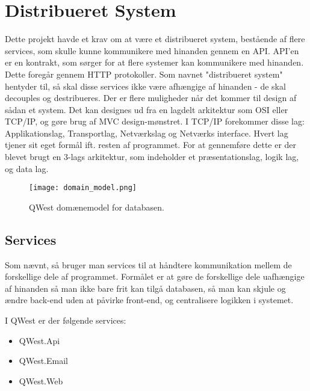 \section{Distribueret System}\label{sec:distSys}
Dette projekt havde et krav om at være et distribueret system, bestående af flere services, som skulle kunne kommunikere med hinanden gennem en API. API'en er en kontrakt, som sørger for at flere systemer kan kommunikere med hinanden\cite{API}. Dette foregår gennem HTTP protokoller\cite{http}. 
Som navnet "distribueret system" hentyder til, så skal disse services ikke være afhængige af hinanden - de skal decouples\cite{decoupling} og destribueres. Der er flere muligheder når det kommer til design af sådan et system. Det kan designes ud fra en lagdelt arkitektur som OSI eller TCP/IP\cite{osi_tcp}, og gøre brug af MVC design-mønstret. I TCP/IP forekommer disse lag: Applikationslag, Transportlag, Netværkslag og Netværks interface. 
Hvert lag tjener sit eget formål ift. resten af programmet. 
For at gennemføre dette er der blevet brugt en 3-lags arkitektur, som indeholder et præsentationslag, logik lag, og data lag. 

\begin{figure}
    \texttt{[image: domain\_model.png]}
    \caption{QWest domænemodel for databasen.}
    \label{fig:domain_model}
\end{figure}

\subsection{Services}\label{sec:servicesArc}
Som nævnt, så bruger man services til at håndtere kommunikation mellem de forskellige dele af programmet. Formålet er at gøre de forskellige dele uafhængige af hinanden så man ikke bare frit kan tilgå databasen, så man kan skjule og ændre back-end uden at påvirke front-end, og centralisere logikken i systemet. 

I QWest er der følgende services:
\begin{itemize}\label{services}
    \item QWest.Api
    \item QWest.Email
    \item QWest.Web
\end{itemize}

